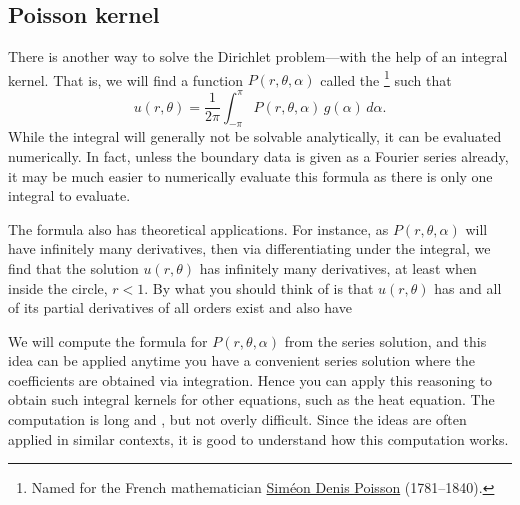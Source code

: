 
\subsection{Poisson kernel}

There is another way to solve the Dirichlet problem---with the help of an
integral kernel.  That is, we will find a function $P(r,\theta,\alpha)$
called the \emph{}\footnote{%
Named for the French mathematician
\href{https://en.wikipedia.org/wiki/Sim\%C3\%A9on_Denis_Poisson}{Sim\'eon
Denis Poisson}
(1781--1840).} such that
\begin{equation*}
u(r,\theta) = 
\frac{1}{2\pi}
\int_{-\pi}^{\pi}
P(r,\theta,\alpha) \, g(\alpha) \,d\alpha .
\end{equation*}
While the integral will generally not be solvable analytically, it can
be evaluated numerically.   In fact, unless the boundary data is given
as a Fourier series already, it may be much easier to numerically
evaluate this formula as there is only one integral to evaluate.

The formula also has theoretical applications.
For instance, as $P(r,\theta,\alpha)$ 
will have infinitely many derivatives, then
via differentiating under the integral, we find
that the solution $u(r,\theta)$ has infinitely many derivatives, at least
when inside the circle, $r < 1$.  By  what you
should think of is that $u(r,\theta)$ has  and all of its
partial derivatives of all orders exist and also have 


We will compute
the formula for $P(r,\theta,\alpha)$ from the series
solution, and this idea can be applied anytime you have a convenient
series solution where the coefficients are obtained via integration.
Hence you can apply this reasoning to obtain such integral kernels
for other equations, such as the heat equation.
The computation is long and , but not overly difficult.
Since the ideas are often applied in similar contexts, it is good to
understand how this computation works.

